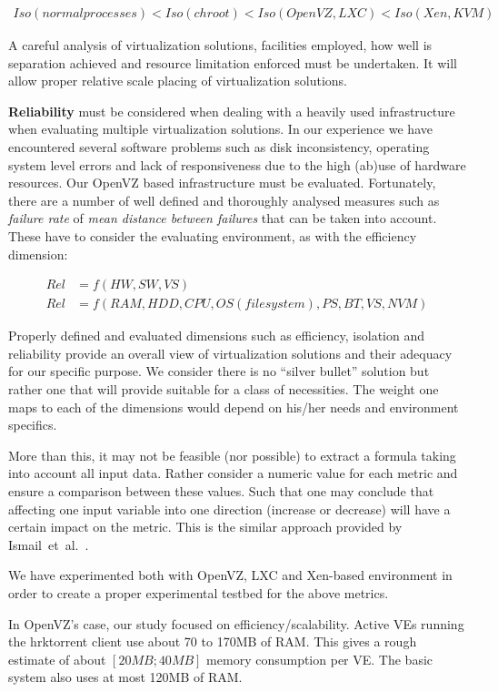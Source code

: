 \begin{align}
Iso(normal processes) < Iso(chroot) < Iso(OpenVZ, LXC) < Iso(Xen,KVM)
\end{align}

A careful analysis of virtualization solutions, facilities employed, how well
is separation achieved and resource limitation enforced must be undertaken. It
will allow proper relative scale placing of virtualization solutions.

\textbf{Reliability} must be considered when dealing with a heavily used
infrastructure when evaluating multiple virtualization solutions. In our
experience we have encountered several software problems such as disk
inconsistency, operating system level errors and lack of responsiveness due to
the high (ab)use of hardware resources. Our OpenVZ based infrastructure must
be evaluated. Fortunately, there are a number of well defined and thoroughly
analysed measures such as \textit{failure rate} of \textit{mean distance
between failures} that can be taken into account. These have to consider the
evaluating environment, as with the efficiency dimension:

\begin{align}
Rel & = f(HW, SW, VS)\\
Rel & = f(RAM, HDD, CPU, OS (filesystem), PS, BT, VS, NVM)
\end{align}

Properly defined and evaluated dimensions such as efficiency, isolation and
reliability provide an overall view of virtualization solutions and their
adequacy for our specific purpose. We consider there is no ``silver bullet''
solution but rather one that will provide suitable for a class of necessities.
The weight one maps to each of the dimensions would depend on his/her needs
and environment specifics.

More than this, it may not be feasible (nor possible) to extract a formula
taking into account all input data. Rather consider a numeric value for each
metric and ensure a comparison between these values. Such that one may
conclude that affecting one input variable into one direction (increase or
decrease) will have a certain impact on the metric. This is the similar
approach provided by Ismail~et~al.~\cite{virt-metrics}.

We have experimented both with OpenVZ, LXC and Xen-based environment in order
to create a proper experimental testbed for the above metrics.

In OpenVZ's case, our study focused on efficiency/scalability. Active VEs
running the hrktorrent client use about 70 to 170MB of RAM. This gives a rough
estimate of about $[20 MB; 40 MB]$ memory consumption per VE. The basic system
also uses at most 120MB of RAM.

